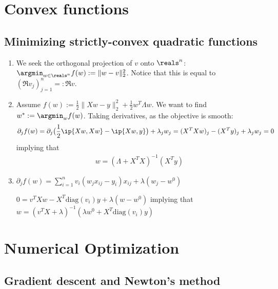 \documentclass{article}
\begin{document}
\begin{enumerate}
\end{enumerate}

\section{Convex functions}
\label{sec:convex-functions}

\subsection{Minimizing strictly-convex quadratic functions}
\label{sec:minim-strictly-conv}

\begin{enumerate}
\item We seek the orthogonal projection of $v$ onto $\reals^n$: $\argmin_{w\in
    \reals^n} f(w) := \|w - v\|_2^2$. Notice that this is equal to $(\Re
  v_j)_{j=1}^n =: \Re v$. 
\item Assume $f(w) := \frac{1}{2} \|Xw - y\|_2^2 + \frac{1}{2} w^T \Lambda
  w$. We want to find $w^* := \argmin_w f(w)$. Taking derivatives, as the
  objective is smooth:
  \begin{align*}
    \partial_j f(w) = \partial_j \big( \frac{1}{2}\ip{Xw, Xw} - \ip{Xw, y} \big) +
    \lambda_j w_j = (X^T X w)_j - (X^T y)_j + \lambda_j w_j  = 0
  \end{align*}
  implying that
  \begin{align*}
    w = (\Lambda + X^T X)^{-1} (X^T y)
  \end{align*}
  
\item $\partial_j f(w) = \sum_{i=1}^n v_i (w_j x_{ij} - y_i)x_{ij} +
  \lambda (w_j - w^0)$

  $0 = v^T X w - X^T \mathrm{diag}(v_i) y + \lambda (w-w^0)$ implying that $w =
  (v^TX + \lambda)^{-1} (\lambda w^0 + X^T \mathrm{diag}(v_i) y)$
\end{enumerate}

\clearpage
\section{Numerical Optimization}
\label{sec:numer-optim}

\subsection{Gradient descent and Newton's method}
\label{sec:grad-desc-newt}
\end{document}
